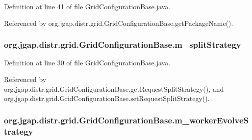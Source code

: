 Definition at line 41 of file Grid\-Configuration\-Base.\-java.



Referenced by org.\-jgap.\-distr.\-grid.\-Grid\-Configuration\-Base.\-get\-Package\-Name().

\hypertarget{classorg_1_1jgap_1_1distr_1_1grid_1_1_grid_configuration_base_a93f9ffd151b6d4ec26bc14b02a5c73af}{
\subsubsection[{m\-\_\-split\-Strategy}]{ org.\-jgap.\-distr.\-grid.\-Grid\-Configuration\-Base.\-m\-\_\-split\-Strategy\hspace{0.3cm}{\ttfamily [private]}}}\label{classorg_1_1jgap_1_1distr_1_1grid_1_1_grid_configuration_base_a93f9ffd151b6d4ec26bc14b02a5c73af}


Definition at line 30 of file Grid\-Configuration\-Base.\-java.



Referenced by org.\-jgap.\-distr.\-grid.\-Grid\-Configuration\-Base.\-get\-Request\-Split\-Strategy(), and org.\-jgap.\-distr.\-grid.\-Grid\-Configuration\-Base.\-set\-Request\-Split\-Strategy().

\hypertarget{classorg_1_1jgap_1_1distr_1_1grid_1_1_grid_configuration_base_a339cceb4d7df014677a8780e81b3428e}{
\subsubsection[{m\-\_\-worker\-Evolve\-Strategy}]{ org.\-jgap.\-distr.\-grid.\-Grid\-Configuration\-Base.\-m\-\_\-worker\-Evolve\-Strategy\hspace{0.3cm}{\ttfamily [private]}}}\label{classorg_1_1jgap_1_1distr_1_1grid_1_1_grid_configuration_base_a339cceb4d7df014677a8780e81b3428e}


